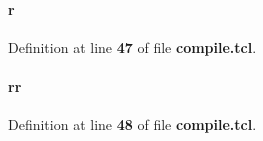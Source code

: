 \paragraph[{r}]{\setlength{\rightskip}{0pt plus 5cm}r}\label{tx__path__top_2handshake__sync_2compile_8tcl_a514f1b439f404f86f77090fa9edc96ce}


Definition at line {\bf 47} of file {\bf compile.\+tcl}.

\paragraph[{rr}]{\setlength{\rightskip}{0pt plus 5cm}rr}\label{tx__path__top_2handshake__sync_2compile_8tcl_aeb9279982226a42afdf2860dbdc29b45}


Definition at line {\bf 48} of file {\bf compile.\+tcl}.

